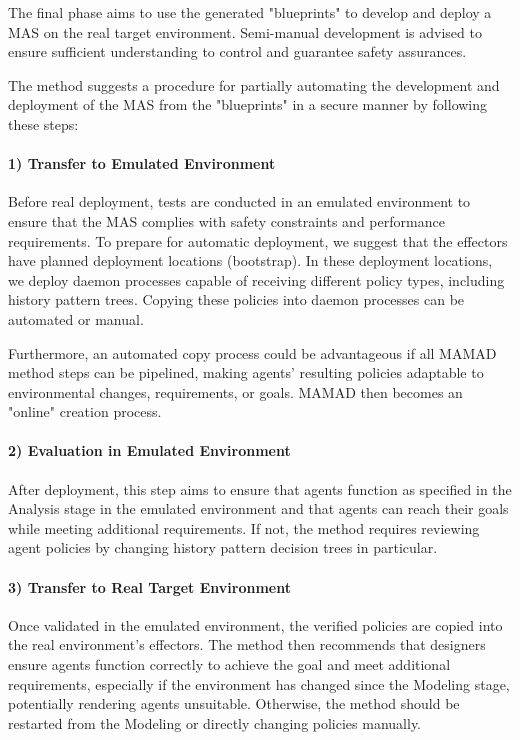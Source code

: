 \documentclass[pdflatex,sn-mathphys-num]{sn-jnl}%
\theoremstyle{thmstyleone}%
\theoremstyle{thmstyletwo}%
\theoremstyle{thmstylethree}%
\begin{document}
The final phase aims to use the generated "blueprints" to develop and deploy a MAS on the real target environment. Semi-manual development is advised to ensure sufficient understanding to control and guarantee safety assurances.

The method suggests a procedure for partially automating the development and deployment of the MAS from the "blueprints" in a secure manner by following these steps:

\paragraph{\textbf{1) Transfer to Emulated Environment}}

Before real deployment, tests are conducted in an emulated environment to ensure that the MAS complies with safety constraints and performance requirements. To prepare for automatic deployment, we suggest that the effectors have planned deployment locations (bootstrap). In these deployment locations, we deploy daemon processes capable of receiving different policy types, including history pattern trees. Copying these policies into daemon processes can be automated or manual.

Furthermore, an automated copy process could be advantageous if all MAMAD method steps can be pipelined, making agents' resulting policies adaptable to environmental changes, requirements, or goals. MAMAD then becomes an "online" creation process.

\paragraph{\textbf{2) Evaluation in Emulated Environment}}

After deployment, this step aims to ensure that agents function as specified in the Analysis stage in the emulated environment and that agents can reach their goals while meeting additional requirements. If not, the method requires reviewing agent policies by changing history pattern decision trees in particular.

\paragraph{\textbf{3) Transfer to Real Target Environment}}

Once validated in the emulated environment, the verified policies are copied into the real environment's effectors. The method then recommends that designers ensure agents function correctly to achieve the goal and meet additional requirements, especially if the environment has changed since the Modeling stage, potentially rendering agents unsuitable. Otherwise, the method should be restarted from the Modeling or directly changing policies manually.
\end{document}

